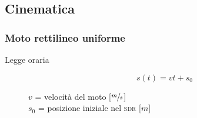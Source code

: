 \documentclass[a4paper,11pt,italian]{article}
\begin{document}
\begin{description}
\end{description}



\subsection{Cinematica}\label{sec:cinematica}
\subsubsection{Moto rettilineo uniforme}
\begin{description}
  \item[Legge oraria] 
  \[ s(t) = v  t + s_0 \]
  \begin{multicols}{2}
  $ v $ = velocità del moto [$ \sfrac{m}{s} $]\\
  $ s_0 $ = posizione iniziale nel \textsc{sdr} [$ m $]
  \end{multicols}
\end{description}
\end{document}
